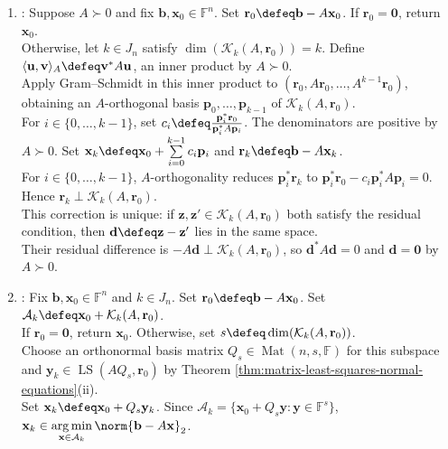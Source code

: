 \begin{computationmethod}
\begin{enumerate}[label=(\roman*)]
At breakdown $s$, set $\beta_s\defeq0$; the recurrence through $j=s$ remains valid.
\item {}: Suppose $A\succ0$ and fix $\mathbf{b},\mathbf{x}_0\in\mathbb{F}^n$. Set $\mathbf{r}_0\defeq\mathbf{b}-A\mathbf{x}_0$. If $\mathbf{r}_0=\mathbf{0}$, return $\mathbf{x}_0$.\\
Otherwise, let $k\in J_n$ satisfy $\dim(\mathcal{K}_k(A,\mathbf{r}_0))=k$. Define $\langle\mathbf{u},\mathbf{v}\rangle_A\defeq\mathbf{v}^*A\mathbf{u}$, an inner product by $A\succ0$.\\
Apply Gram--Schmidt in this inner product to $(\mathbf{r}_0,A\mathbf{r}_0,\ldots,A^{k-1}\mathbf{r}_0)$, obtaining an $A$-orthogonal basis $\mathbf{p}_0,\ldots,\mathbf{p}_{k-1}$ of $\mathcal{K}_k(A,\mathbf{r}_0)$.\\
For $i\in\{0,\ldots,k-1\}$, set $c_i\defeq\frac{\mathbf{p}_i^*\mathbf{r}_0}{\mathbf{p}_i^*A\mathbf{p}_i}$. The denominators are positive by $A\succ0$. Set $\mathbf{x}_k\defeq\mathbf{x}_0+\sum\limits_{i=0}^{k-1}c_i\mathbf{p}_i$ and $\mathbf{r}_k\defeq\mathbf{b}-A\mathbf{x}_k$.\\
For $i\in\{0,\ldots,k-1\}$, $A$-orthogonality reduces $\mathbf{p}_i^*\mathbf{r}_k$ to $\mathbf{p}_i^*\mathbf{r}_0-c_i\mathbf{p}_i^*A\mathbf{p}_i=0$. Hence $\mathbf{r}_k\perp\mathcal{K}_k(A,\mathbf{r}_0)$.\\
This correction is unique: if $\mathbf{z},\mathbf{z}'\in\mathcal{K}_k(A,\mathbf{r}_0)$ both satisfy the residual condition, then $\mathbf{d}\defeq\mathbf{z}-\mathbf{z}'$ lies in the same space.\\
Their residual difference is $-A\mathbf{d}\perp\mathcal{K}_k(A,\mathbf{r}_0)$, so $\mathbf{d}^*A\mathbf{d}=0$ and $\mathbf{d}=\mathbf{0}$ by $A\succ0$.
\item {}: Fix $\mathbf{b},\mathbf{x}_0\in\mathbb{F}^n$ and $k\in J_n$. Set $\mathbf{r}_0\defeq\mathbf{b}-A\mathbf{x}_0$. Set $\mathcal{A}_k\defeq\mathbf{x}_0+\mathcal{K}_k(A,\mathbf{r}_0)$.\\
If $\mathbf{r}_0=\mathbf{0}$, return $\mathbf{x}_0$. Otherwise, set $s\defeq\dim(\mathcal{K}_k(A,\mathbf{r}_0))$.\\
Choose an orthonormal basis matrix $Q_s\in\operatorname{Mat}(n,s,\mathbb{F})$ for this subspace and $\mathbf{y}_k\in\operatorname{LS}(AQ_s,\mathbf{r}_0)$ by Theorem \ref{thm:matrix-least-squares-normal-equations}(ii).\\
Set $\mathbf{x}_k\defeq\mathbf{x}_0+Q_s\mathbf{y}_k$. Since $\mathcal{A}_k=\{\mathbf{x}_0+Q_s\mathbf{y}:\mathbf{y}\in\mathbb{F}^s\}$, $\mathbf{x}_k\in\operatorname*{arg\,min}\limits_{\mathbf{x}\in\mathcal{A}_k}\norm{\mathbf{b}-A\mathbf{x}}_2$.

\end{enumerate}
\end{computationmethod}
